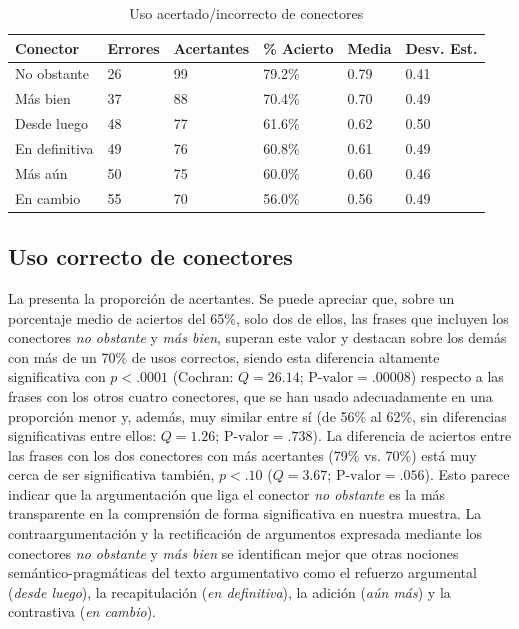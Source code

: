 \documentclass[spanish]{textolivre}
\begin{document}
\begin{table}[h!]
\centering
\begin{threeparttable}
\caption{Uso acertado/incorrecto de conectores}
\label{tab1}
\begin{tabular}{llllll}
\toprule
Conector & Errores & Acertantes & \% Acierto & Media & Desv. Est. \\
\midrule
No obstante & 26 & 99 & 79.2\% & 0.79 & 0.41 \\
Más bien & 37 & 88 & 70.4\% & 0.70 & 0.49 \\
Desde luego & 48 & 77 & 61.6\% & 0.62 & 0.50 \\
En definitiva & 49 & 76 & 60.8\% & 0.61 & 0.49 \\
Más aún & 50 & 75 & 60.0\% & 0.60 & 0.46 \\
En cambio & 55 & 70 & 56.0\% & 0.56 & 0.49 \\
\bottomrule
\end{tabular}
\end{threeparttable}
\end{table}


\subsection{Uso correcto de conectores}

La  presenta la proporción de acertantes. Se puede apreciar que, sobre un porcentaje medio de aciertos del 65\%, solo dos de ellos, las frases que incluyen los conectores \emph{no obstante} y \emph{más bien}, superan este valor y destacan sobre los demás con más de un 70\% de usos correctos, siendo esta diferencia altamente significativa con $p<.0001$ (Cochran: $Q=26.14$; $\text{P-valor}=.00008$) respecto a las frases con los otros cuatro conectores, que se han usado adecuadamente en una proporción menor y, además, muy similar entre sí (de 56\% al 62\%, sin diferencias significativas entre ellos: $Q=1.26$; $\text{P-valor}=.738$). La diferencia de aciertos entre las frases con los dos conectores con más acertantes (79\% vs. 70\%) está muy cerca de ser significativa también, $p<.10$ ($Q=3.67$; $\text{P-valor}=.056$). Esto parece indicar que la argumentación que liga el conector \textit{no obstante} es la más transparente en la comprensión de forma significativa en nuestra muestra. La contraargumentación y la rectificación de argumentos expresada mediante los conectores \textit{no obstante} y \textit{más bien} se identifican mejor que otras nociones semántico-pragmáticas del texto argumentativo como el refuerzo argumental (\emph{desde luego}), la recapitulación (\emph{en definitiva}), la adición (\emph{aún más}) y la contrastiva (\emph{en cambio}).
\end{document}
